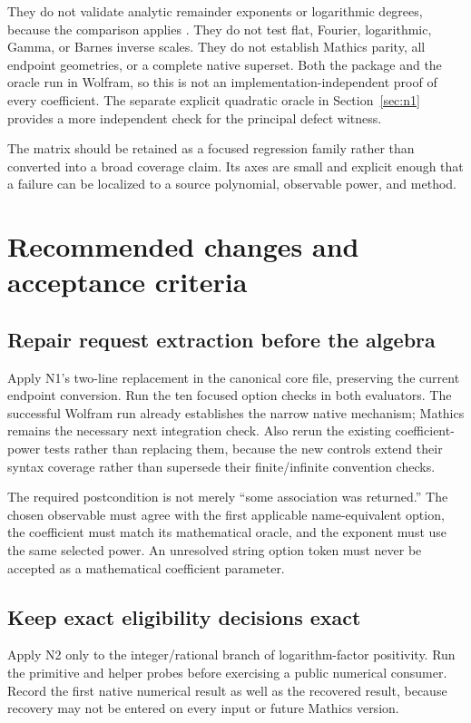 \documentclass[11pt,letterpaper]{article}
\newcommand{\code}[1]{\texttt{\detokenize{#1}}}
\begin{document}
They do not validate analytic remainder exponents or logarithmic degrees, because the comparison applies \code{Normal}. They do not test flat, Fourier, logarithmic, Gamma, or Barnes inverse scales. They do not establish Mathics parity, all endpoint geometries, or a complete native superset. Both the package and the oracle run in Wolfram, so this is not an implementation-independent proof of every coefficient. The separate explicit quadratic oracle in Section~\ref{sec:n1} provides a more independent check for the principal defect witness.

The matrix should be retained as a focused regression family rather than converted into a broad coverage claim. Its axes are small and explicit enough that a failure can be localized to a source polynomial, observable power, and method.

\section{Recommended changes and acceptance criteria}
\label{sec:recommendations}

\subsection{Repair request extraction before the algebra}
Apply N1's two-line replacement in the canonical core file, preserving the current endpoint conversion. Run the ten focused option checks in both evaluators. The successful Wolfram run already establishes the narrow native mechanism; Mathics remains the necessary next integration check. Also rerun the existing coefficient-power tests rather than replacing them, because the new controls extend their syntax coverage rather than supersede their finite/infinite convention checks.~\cite{coeftests}

The required postcondition is not merely ``some association was returned.'' The chosen observable must agree with the first applicable name-equivalent option, the coefficient must match its mathematical oracle, and the exponent must use the same selected power. An unresolved string option token must never be accepted as a mathematical coefficient parameter.

\subsection{Keep exact eligibility decisions exact}
Apply N2 only to the integer/rational branch of logarithm-factor positivity. Run the primitive and helper probes before exercising a public numerical consumer. Record the first native numerical result as well as the recovered result, because recovery may not be entered on every input or future Mathics version.
\end{document}
